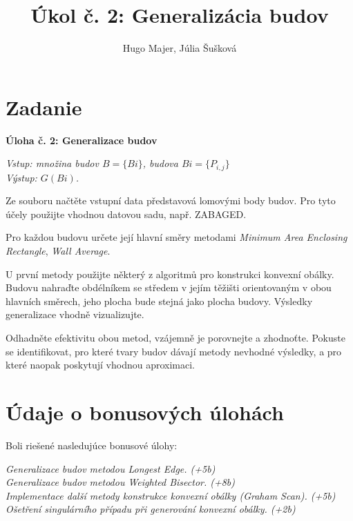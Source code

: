 \documentclass[11pt]{article}
\title{\textbf{Úkol č. 2: Generalizácia budov}}
\author{Hugo Majer, Júlia Šušková}
\begin{document}
\maketitle

\newpage
{}
\section{Zadanie}
\textbf{Úloha č. 2: Generalizace budov}

\textit{Vstup: množina budov $B = \{Bi\}$, budova $Bi = \{P_{i,j}\}$}\\
\textit{Výstup: $G(Bi)$.}

Ze souboru načtěte vstupní data představová lomovými body budov. Pro tyto účely použijte vhodnou datovou
sadu, např. ZABAGED.

Pro každou budovu určete její hlavní směry metodami \textit{Minimum Area Enclosing Rectangle}, \textit{Wall Average}.

U první metody použijte některý z algoritmů pro konstrukci konvexní obálky. Budovu nahraďte obdélníkem se
středem v jejím těžišti orientovaným v obou hlavních směrech, jeho plocha bude stejná jako plocha budovy. Výsledky generalizace vhodně vizualizujte.

Odhadněte efektivitu obou metod, vzájemně je porovnejte a zhodnoťte. Pokuste se identifikovat, pro které tvary budov dávají metody nevhodné výsledky, a pro které naopak poskytují vhodnou aproximaci.

\newpage
\section{Údaje o bonusových úlohách}
Boli riešené nasledujúce bonusové úlohy:

\textit{Generalizace budov metodou Longest Edge. (+5b)\\
Generalizace budov metodou Weighted Bisector. (+8b)\\
Implementace další metody konstrukce konvexní obálky (Graham Scan). (+5b)\\
Ošetření singulárního případu při generování konvexní obálky. (+2b)}

\setlength{\parindent}{1cm}
\newpage
\end{document}
